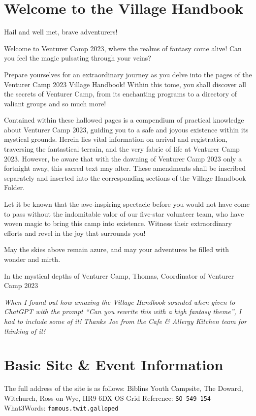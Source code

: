 \documentclass[a4paper, 11pt]{report}
\begin{document}
\tableofcontents
\chapter{Welcome to the Village Handbook}
Hail and well met, brave adventurers!\nl

Welcome to Venturer Camp 2023, where the realms of fantasy come alive! Can you feel the magic pulsating through your veins?\nl

Prepare yourselves for an extraordinary journey as you delve into the pages of the Venturer Camp 2023 Village Handbook! Within this tome, you shall discover all the secrets of Venturer Camp, from its enchanting programs to a directory of valiant groups and so much more!\nl

Contained within these hallowed pages is a compendium of practical knowledge about Venturer Camp 2023, guiding you to a safe and joyous existence within its mystical grounds. Herein lies vital information on arrival and registration, traversing the fantastical terrain, and the very fabric of life at Venturer Camp 2023. However, be aware that with the dawning of Venturer Camp 2023 only a fortnight away, this sacred text may alter. These amendments shall be inscribed separately and inserted into the corresponding sections of the Village Handbook Folder.\nl

Let it be known that the awe-inspiring spectacle before you would not have come to pass without the indomitable valor of our five-star volunteer team, who have woven magic to bring this camp into existence. Witness their extraordinary efforts and revel in the joy that surrounds you!\nl

May the skies above remain azure, and may your adventures be filled with wonder and mirth.\nl

In the mystical depths of Venturer Camp,\nl
Thomas,\nl
Coordinator of Venturer Camp 2023\nl

\textit{When I found out how amazing the Village Handbook sounded when given to ChatGPT with the prompt ``Can you rewrite this with a high fantasy theme'', I had to include some of it! Thanks Joe from the Cafe \& Allergy Kitchen team for thinking of it!}


\chapter{Basic Site \& Event Information}
The full address of the site is as follows:\nl
Biblins Youth Campsite,\nl
The Doward,\nl
Witchurch,\nl
Ross-on-Wye,\nl
HR9 6DX\nl
OS Grid Reference: \texttt{SO 549 154}\nl
What3Words: \texttt{famous.twit.galloped}\nl
\end{document}
